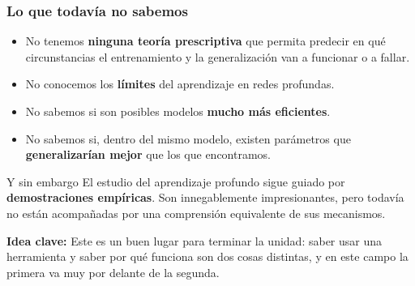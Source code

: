 \documentclass[aspectratio=169, 10pt]{beamer}
\newcommand{\idea}[1]{%
	\begin{tcolorbox}[colback=AccentGreen!6, colframe=AccentGreen, arc=3pt,
		width=\textwidth, boxsep=1pt, left=5pt, right=5pt, top=2pt, bottom=2pt,
		fontupper=\small]
		\RaggedRight\textbf{Idea clave:} #1
	\end{tcolorbox}
}
\begin{document}
\begin{frame}
\frametitle{Lo que todavía no sabemos}
\footnotesize %
\begin{center}
\begin{tcolorbox}[colback=StanfordRed!5, colframe=StanfordRed, arc=4pt,
	width=0.95\textwidth, fontupper=\small]
\RaggedRight
\begin{itemize}
	\item No tenemos \textbf{ninguna teor\'ia prescriptiva} que permita predecir en qu\'e circunstancias el entrenamiento y la generalizaci\'on van a funcionar o a fallar.
	\item No conocemos los \textbf{l\'imites} del aprendizaje en redes profundas.
	\item No sabemos si son posibles modelos \textbf{mucho m\'as eficientes}.
	\item No sabemos si, dentro del mismo modelo, existen par\'ametros que \textbf{generalizar\'ian mejor} que los que encontramos.
\end{itemize}
\end{tcolorbox}
\end{center}
\vspace{0.5em}
\begin{block}{Y sin embargo}
El estudio del aprendizaje profundo sigue guiado por \textbf{demostraciones emp\'iricas}. Son innegablemente impresionantes, pero todav\'ia no est\'an acompa\~nadas por una comprensi\'on equivalente de sus mecanismos.
\end{block}
\vspace{0.4em}
\idea{Este es un buen lugar para terminar la unidad: saber usar una herramienta y saber por qu\'e funciona son dos cosas distintas, y en este campo la primera va muy por delante de la segunda.}
\end{frame}
\end{document}
